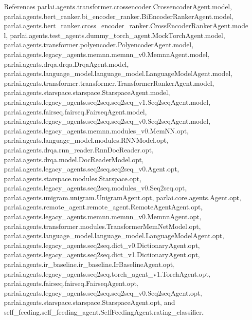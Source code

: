 References parlai.\+agents.\+transformer.\+crossencoder.\+Crossencoder\+Agent.\+model, parlai.\+agents.\+bert\+\_\+ranker.\+bi\+\_\+encoder\+\_\+ranker.\+Bi\+Encoder\+Ranker\+Agent.\+model, parlai.\+agents.\+bert\+\_\+ranker.\+cross\+\_\+encoder\+\_\+ranker.\+Cross\+Encoder\+Ranker\+Agent.\+model, parlai.\+agents.\+test\+\_\+agents.\+dummy\+\_\+torch\+\_\+agent.\+Mock\+Torch\+Agent.\+model, parlai.\+agents.\+transformer.\+polyencoder.\+Polyencoder\+Agent.\+model, parlai.\+agents.\+legacy\+\_\+agents.\+memnn.\+memnn\+\_\+v0.\+Memnn\+Agent.\+model, parlai.\+agents.\+drqa.\+drqa.\+Drqa\+Agent.\+model, parlai.\+agents.\+language\+\_\+model.\+language\+\_\+model.\+Language\+Model\+Agent.\+model, parlai.\+agents.\+transformer.\+transformer.\+Transformer\+Ranker\+Agent.\+model, parlai.\+agents.\+starspace.\+starspace.\+Starspace\+Agent.\+model, parlai.\+agents.\+legacy\+\_\+agents.\+seq2seq.\+seq2seq\+\_\+v1.\+Seq2seq\+Agent.\+model, parlai.\+agents.\+fairseq.\+fairseq.\+Fairseq\+Agent.\+model, parlai.\+agents.\+legacy\+\_\+agents.\+seq2seq.\+seq2seq\+\_\+v0.\+Seq2seq\+Agent.\+model, parlai.\+agents.\+legacy\+\_\+agents.\+memnn.\+modules\+\_\+v0.\+Mem\+N\+N.\+opt, parlai.\+agents.\+language\+\_\+model.\+modules.\+R\+N\+N\+Model.\+opt, parlai.\+agents.\+drqa.\+rnn\+\_\+reader.\+Rnn\+Doc\+Reader.\+opt, parlai.\+agents.\+drqa.\+model.\+Doc\+Reader\+Model.\+opt, parlai.\+agents.\+legacy\+\_\+agents.\+seq2seq.\+seq2seq\+\_\+v0.\+Agent.\+opt, parlai.\+agents.\+starspace.\+modules.\+Starspace.\+opt, parlai.\+agents.\+legacy\+\_\+agents.\+seq2seq.\+modules\+\_\+v0.\+Seq2seq.\+opt, parlai.\+agents.\+unigram.\+unigram.\+Unigram\+Agent.\+opt, parlai.\+core.\+agents.\+Agent.\+opt, parlai.\+agents.\+remote\+\_\+agent.\+remote\+\_\+agent.\+Remote\+Agent\+Agent.\+opt, parlai.\+agents.\+legacy\+\_\+agents.\+memnn.\+memnn\+\_\+v0.\+Memnn\+Agent.\+opt, parlai.\+agents.\+transformer.\+modules.\+Transformer\+Mem\+Net\+Model.\+opt, parlai.\+agents.\+language\+\_\+model.\+language\+\_\+model.\+Language\+Model\+Agent.\+opt, parlai.\+agents.\+legacy\+\_\+agents.\+seq2seq.\+dict\+\_\+v0.\+Dictionary\+Agent.\+opt, parlai.\+agents.\+legacy\+\_\+agents.\+seq2seq.\+dict\+\_\+v1.\+Dictionary\+Agent.\+opt, parlai.\+agents.\+ir\+\_\+baseline.\+ir\+\_\+baseline.\+Ir\+Baseline\+Agent.\+opt, parlai.\+agents.\+legacy\+\_\+agents.\+seq2seq.\+torch\+\_\+agent\+\_\+v1.\+Torch\+Agent.\+opt, parlai.\+agents.\+fairseq.\+fairseq.\+Fairseq\+Agent.\+opt, parlai.\+agents.\+legacy\+\_\+agents.\+seq2seq.\+seq2seq\+\_\+v0.\+Seq2seq\+Agent.\+opt, parlai.\+agents.\+starspace.\+starspace.\+Starspace\+Agent.\+opt, and self\+\_\+feeding.\+self\+\_\+feeding\+\_\+agent.\+Self\+Feeding\+Agent.\+rating\+\_\+classifier.



